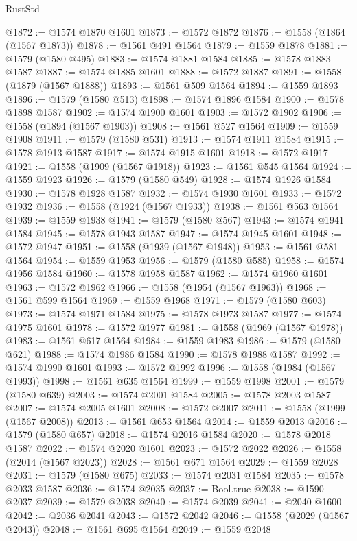 \begin{lexlean}{RustStd}
\begin{coremodule}
@1872 := @1574 @1870 @1601
@1873 := @1572 @1872
@1876 := @1558 (@1864 (@1567 @1873))
@1878 := @1561 @491 @1564
@1879 := @1559 @1878
@1881 := @1579 (@1580 @495)
@1883 := @1574 @1881 @1584
@1885 := @1578 @1883 @1587
@1887 := @1574 @1885 @1601
@1888 := @1572 @1887
@1891 := @1558 (@1879 (@1567 @1888))
@1893 := @1561 @509 @1564
@1894 := @1559 @1893
@1896 := @1579 (@1580 @513)
@1898 := @1574 @1896 @1584
@1900 := @1578 @1898 @1587
@1902 := @1574 @1900 @1601
@1903 := @1572 @1902
@1906 := @1558 (@1894 (@1567 @1903))
@1908 := @1561 @527 @1564
@1909 := @1559 @1908
@1911 := @1579 (@1580 @531)
@1913 := @1574 @1911 @1584
@1915 := @1578 @1913 @1587
@1917 := @1574 @1915 @1601
@1918 := @1572 @1917
@1921 := @1558 (@1909 (@1567 @1918))
@1923 := @1561 @545 @1564
@1924 := @1559 @1923
@1926 := @1579 (@1580 @549)
@1928 := @1574 @1926 @1584
@1930 := @1578 @1928 @1587
@1932 := @1574 @1930 @1601
@1933 := @1572 @1932
@1936 := @1558 (@1924 (@1567 @1933))
@1938 := @1561 @563 @1564
@1939 := @1559 @1938
@1941 := @1579 (@1580 @567)
@1943 := @1574 @1941 @1584
@1945 := @1578 @1943 @1587
@1947 := @1574 @1945 @1601
@1948 := @1572 @1947
@1951 := @1558 (@1939 (@1567 @1948))
@1953 := @1561 @581 @1564
@1954 := @1559 @1953
@1956 := @1579 (@1580 @585)
@1958 := @1574 @1956 @1584
@1960 := @1578 @1958 @1587
@1962 := @1574 @1960 @1601
@1963 := @1572 @1962
@1966 := @1558 (@1954 (@1567 @1963))
@1968 := @1561 @599 @1564
@1969 := @1559 @1968
@1971 := @1579 (@1580 @603)
@1973 := @1574 @1971 @1584
@1975 := @1578 @1973 @1587
@1977 := @1574 @1975 @1601
@1978 := @1572 @1977
@1981 := @1558 (@1969 (@1567 @1978))
@1983 := @1561 @617 @1564
@1984 := @1559 @1983
@1986 := @1579 (@1580 @621)
@1988 := @1574 @1986 @1584
@1990 := @1578 @1988 @1587
@1992 := @1574 @1990 @1601
@1993 := @1572 @1992
@1996 := @1558 (@1984 (@1567 @1993))
@1998 := @1561 @635 @1564
@1999 := @1559 @1998
@2001 := @1579 (@1580 @639)
@2003 := @1574 @2001 @1584
@2005 := @1578 @2003 @1587
@2007 := @1574 @2005 @1601
@2008 := @1572 @2007
@2011 := @1558 (@1999 (@1567 @2008))
@2013 := @1561 @653 @1564
@2014 := @1559 @2013
@2016 := @1579 (@1580 @657)
@2018 := @1574 @2016 @1584
@2020 := @1578 @2018 @1587
@2022 := @1574 @2020 @1601
@2023 := @1572 @2022
@2026 := @1558 (@2014 (@1567 @2023))
@2028 := @1561 @671 @1564
@2029 := @1559 @2028
@2031 := @1579 (@1580 @675)
@2033 := @1574 @2031 @1584
@2035 := @1578 @2033 @1587
@2036 := @1574 @2035
@2037 := Bool.true
@2038 := @1590 @2037
@2039 := @1579 @2038
@2040 := @1574 @2039
@2041 := @2040 @1600
@2042 := @2036 @2041
@2043 := @1572 @2042
@2046 := @1558 (@2029 (@1567 @2043))
@2048 := @1561 @695 @1564
@2049 := @1559 @2048

\end{coremodule}
\end{lexlean}
